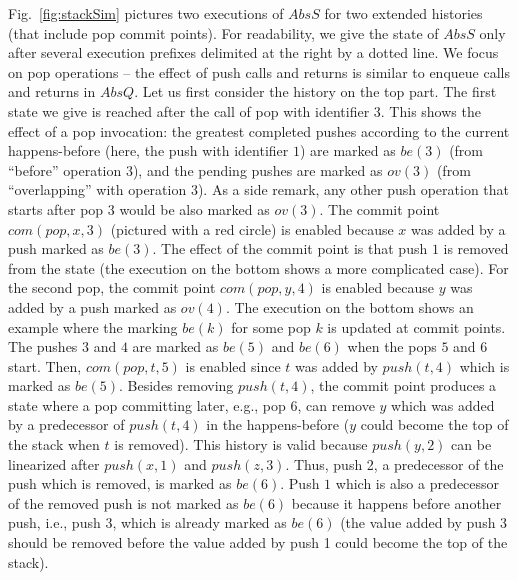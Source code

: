 Fig.~\ref{fig:stackSim} pictures two executions of $AbsS$ for two extended histories (that include pop commit points). For readability, we give the state of $AbsS$ only after several execution prefixes delimited at the right by a dotted line. We focus on pop operations -- the effect of push calls and returns is similar to enqueue calls and returns in $AbsQ$. Let us first consider the history on the top part. The first state we give is reached after the call of pop with identifier $3$. This shows the effect of a pop invocation: the greatest completed pushes according to the current happens-before (here, the push with identifier $1$) are marked as $be(3)$ (from ``before'' operation 3), and the pending pushes are marked as $ov(3)$ (from ``overlapping'' with operation 3). As a side remark, any other push operation that starts after pop $3$ would be also marked as $ov(3)$.
The commit point $com(pop,x,3)$ (pictured with a red circle) is enabled because $x$ was added by a push marked as $be(3)$. The effect of the commit point is that push $1$ is removed from the state (the execution on the bottom shows a more complicated case). For the second pop, the commit point $com(pop,y,4)$ is enabled because $y$ was added by a push marked as $ov(4)$. The execution on the bottom shows an example where the marking $be(k)$ for some pop $k$ is updated at commit points. The pushes $3$ and $4$ are marked as $be(5)$ and $be(6)$
when the pops $5$ and $6$ start. Then, $com(pop,t,5)$ is enabled since $t$ was added by $push(t,4)$ which is marked as $be(5)$. Besides removing $push(t,4)$, the commit point produces a state where a pop committing later, e.g., pop $6$, can remove $y$ which was added by a predecessor of $push(t,4)$ in the happens-before ($y$ could become the top of the stack when $t$ is removed). This history is valid because $push(y,2)$ can be linearized after $push(x,1)$ and $push(z,3)$. Thus, push 2, a predecessor of the push which is removed, is marked as $be(6)$. Push $1$ which is also a predecessor of the removed push is not marked as $be(6)$ because it happens before another push, i.e., push 3, which is already marked as $be(6)$ (the value added by push 3 should be removed before the value added by push 1 could become the top of the stack).

